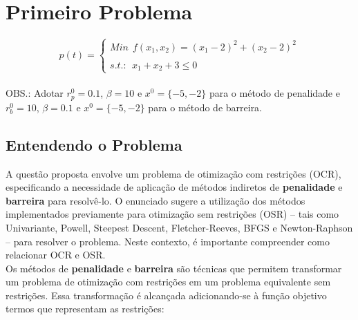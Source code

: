\documentclass[a4paper, 12pt]{article}
\begin{document}
\newpage
\section{Primeiro Problema}
\begin{equation}
     p(t) = \left\{ \begin{array}{rcl}
            Min \>\ f(x_1, x_2) = (x_1 - 2)^2 + (x_2 - 2)^2 \\ \\
            s.t.: \>\ x_1 + x_2 + 3 \leq 0           \end{array} \right.
\end{equation} \\

OBS.: Adotar $r_p ^0=0.1$, $\beta = 10$ e $x^0 = \{-5,-2\}$ para o método de penalidade e $r_b ^0=10$, $\beta = 0.1$ e $x^0 = \{-5,-2\}$ para o método de barreira. \\

\subsection{Entendendo o Problema}


A questão proposta envolve um problema de otimização com restrições (OCR), especificando a necessidade de aplicação de métodos indiretos de \textbf{penalidade} e \textbf{barreira} para resolvê-lo. O enunciado sugere a utilização dos métodos implementados previamente para otimização sem restrições (OSR) – tais como Univariante, Powell, Steepest Descent, Fletcher-Reeves, BFGS e Newton-Raphson – para resolver o problema. Neste contexto, é importante compreender como relacionar OCR e OSR.\\

Os métodos de \textbf{penalidade} e \textbf{barreira} são técnicas que permitem transformar um problema de otimização com restrições em um problema equivalente sem restrições. Essa transformação é alcançada adicionando-se à função objetivo termos que representam as restrições:\\ 
\end{document}

